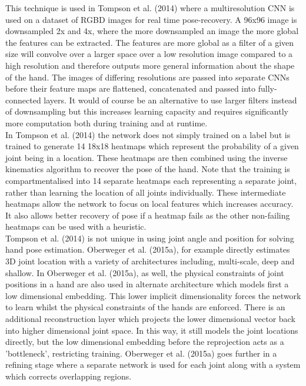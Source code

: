 \documentclass{article}
\begin{document}
This technique is used in Tompson et al. (2014) where a multiresolution CNN is used on a dataset of RGBD images for real time pose-recovery. A 96x96 image is downsampled 2x and 4x, where the more downsampled an image the more global the features can be extracted. The features are more global as a filter of a given size will convolve over a larger space over a low resolution image compared to a high resolution and therefore outputs more general information about the shape of the hand. The images of differing resolutions are passed into separate CNNs before their feature maps are flattened, concatenated and passed into fully-connected layers. It would of course be an alternative to use larger filters instead of downsampling but this increases learning capacity and requires significantly more computation both during training and at runtime.\\

In Tompson et al. (2014) the network does not simply trained on a label but is trained to generate 14 18x18 heatmaps which represent the probability of a given joint being in a location. These heatmaps are then combined using the inverse kinematics algorithm to recover the pose of the hand. Note that the training is compartmentalised into 14 separate heatmaps each representing a separate joint, rather than learning the location of all joints individually. These intermediate heatmaps allow the network to focus on local features which increases accuracy. It also allows better recovery of pose if a heatmap fails as the other non-failing heatmaps can be used with a heuristic.\\

Tompson et al. (2014) is not unique in using joint angle and position for solving hand pose estimation. Oberweger et al. (2015a), for example directly estimates 3D joint location with a variety of architectures including, multi-scale, deep and shallow. In Oberweger et al. (2015a), as well, the physical constraints of joint positions in a hand are also used in alternate architecture which models first a low dimensional embedding. This lower implicit dimensionality forces the network to learn whilst the physical constraints of the hands are enforced. There is an additional reconstruction layer which projects the lower dimensional vector back into higher dimensional joint space. In this way, it still models the joint locations directly, but the low dimensional embedding before the reprojection acts as a 'bottleneck', restricting training. Oberweger et al. (2015a) goes further in a refining stage where a separate network is used for each joint along with a system which corrects overlapping regions.\\
\end{document}
